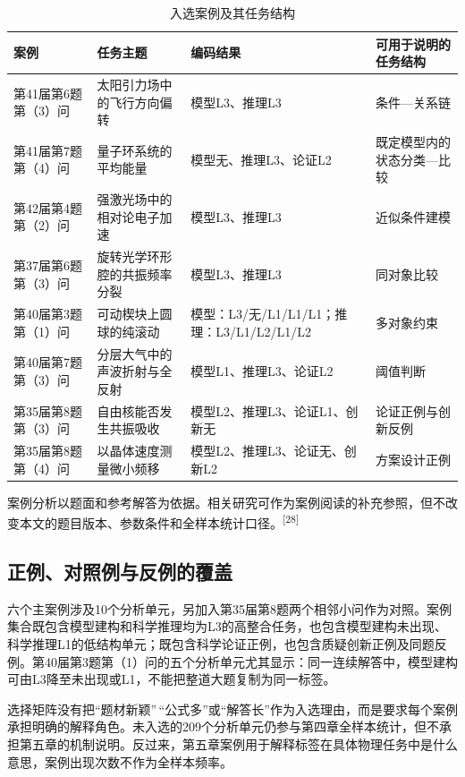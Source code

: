 \documentclass[
  12pt,
  a4paper,twoside,openany]{ctexbook}
\renewcommand{\arraystretch}{1.22}
\begin{document}
\begin{table}[H]
\centering
\caption{入选案例及其任务结构}
\label{tab:third-edition-case-selection}
\footnotesize
\setlength{\tabcolsep}{3pt}
\renewcommand{\arraystretch}{1.05}
\begin{tabular}{p{2.4cm}p{3.2cm}p{4.7cm}p{2.9cm}}
\toprule
案例 & 任务主题 & 编码结果 & 可用于说明的任务结构 \\
\midrule
第41届第6题第（3）问 & 太阳引力场中的飞行方向偏转 & 模型L3、推理L3 & 条件—关系链 \\
第41届第7题第（4）问 & 量子环系统的平均能量 & 模型无、推理L3、论证L2 & 既定模型内的状态分类—比较 \\
第42届第4题第（2）问 & 强激光场中的相对论电子加速 & 模型L3、推理L3 & 近似条件建模 \\
第37届第6题第（3）问 & 旋转光学环形腔的共振频率分裂 & 模型L3、推理L3 & 同对象比较 \\
第40届第3题第（1）问 & 可动楔块上圆球的纯滚动 & 模型：L3/无/L1/L1/L1；推理：L3/L1/L2/L1/L2 & 多对象约束 \\
第40届第7题第（3）问 & 分层大气中的声波折射与全反射 & 模型L1、推理L3、论证L2 & 阈值判断 \\
第35届第8题第（3）问 & 自由核能否发生共振吸收 & 模型L2、推理L3、论证L1、创新无 & 论证正例与创新反例 \\
第35届第8题第（4）问 & 以晶体速度测量微小频移 & 模型L2、推理L3、论证无、创新L2 & 方案设计正例 \\
\bottomrule
\end{tabular}
\end{table}

案例分析以题面和参考解答为依据。相关研究可作为案例阅读的补充参照，但不改变本文的题目版本、参数条件和全样本统计口径。\textsuperscript{[28]}

\subsection{正例、对照例与反例的覆盖}\label{ux6b63ux4f8bux5bf9ux7167ux4f8bux4e0eux53cdux4f8bux7684ux8986ux76d6}

六个主案例涉及10个分析单元，另加入第35届第8题两个相邻小问作为对照。案例集合既包含模型建构和科学推理均为L3的高整合任务，也包含模型建构未出现、科学推理L1的低结构单元；既包含科学论证正例，也包含质疑创新正例及同题反例。第40届第3题第（1）问的五个分析单元尤其显示：同一连续解答中，模型建构可由L3降至未出现或L1，不能把整道大题复制为同一标签。

选择矩阵没有把``题材新颖''\,``公式多''或``解答长''作为入选理由，而是要求每个案例承担明确的解释角色。未入选的209个分析单元仍参与第四章全样本统计，但不承担第五章的机制说明。反过来，第五章案例用于解释标签在具体物理任务中是什么意思，案例出现次数不作为全样本频率。
\end{document}
